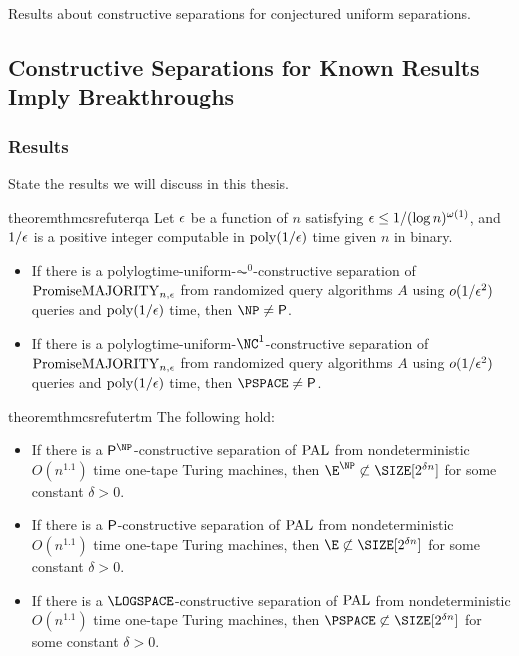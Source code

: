 Results about constructive separations for conjectured uniform separations.

\subsection{Constructive Separations for Known Results Imply Breakthroughs}

\subsubsection{Results}

State the results we will discuss in this thesis.

\begin{restatable}{theorem}{thmcsrefuterqa}\label{thm:csrefuterqa} 
	Let $\epsilon$ be a function of $n$ satisfying $\epsilon \leq 1/(\log n)^{\omega(1)}$, and $1/\epsilon$ is a positive integer
     computable in $\text{poly}(1/\epsilon)$ time given $n$ in binary.
	\begin{itemize}
		\item If there is a polylogtime-uniform-$\AC^0$-constructive separation of $\mathrm{PromiseMAJORITY}_{n,\epsilon}$ from randomized
         query algorithms $A$ using $o(1/\epsilon^2)$ queries and $\text{poly}(1/\epsilon)$ time, then $\NP \ne \PTIME$.
		\item If there is a polylogtime-uniform-$\NC^1$-constructive separation of $\mathrm{PromiseMAJORITY}_{n,\epsilon}$ from randomized
         query algorithms $A$ using $o(1/\epsilon^2)$ queries and $\text{poly}(1/\epsilon)$ time, then $\PSPACE \ne \PTIME$.
	\end{itemize}
\end{restatable}

\begin{restatable}{theorem}{thmcsrefutertm}\label{thm:csrefutertm} 
The following hold:
	\begin{itemize}
	    \item If there is a $\PTIME^{\NP}$-constructive separation of $\mathrm{PAL}$
		from nondeterministic $O(n^{1.1})$ time one-tape Turing machines, then
		$\E^{\NP} \not \subset \SIZE[2^{\delta n}]$ for some constant $\delta >0$.
	    
        \item If there is a $\mathsf{P}$-constructive separation of $\mathrm{PAL}$ 
		from nondeterministic $O(n^{1.1})$ time one-tape Turing machines, then
		 $\E \not \subset \SIZE[2^{\delta n}]$ for some constant $\delta >0$.
        
        \item If there is a $\LOGSPACE$-constructive separation of $\mathrm{PAL}$ 
		from nondeterministic $O(n^{1.1})$ time one-tape Turing machines, then
		 $\PSPACE \not \subset \SIZE[2^{\delta n}]$ for some constant $\delta >0$.
	\end{itemize}
\end{restatable}


